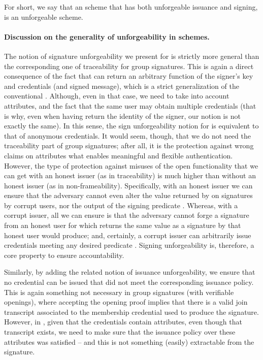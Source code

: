 For short, we say that an \UAS scheme that has both unforgeable issuance and
signing, is an unforgeable \UAS scheme.

\paragraph{Discussion on the generality of unforgeability in \UAS schemes.} %
The notion of signature unforgeability we present for \UAS is strictly more
general than the corresponding one of traceability for group signatures. This is
again a direct consequence of the fact that \Open can return an arbitrary
function of the signer's key and credentials (and signed message), which is a
strict generalization of the conventional \Open. Although, even in that case, we
need to take into account attributes, and the fact that the same user may obtain
multiple credentials (that is why, even when having \Open return the identity of
the signer, our notion is not exactly the same). In this sense, the sign
unforgeability notion for \UAS is equivalent to that of anonymous
credentials. It would seem, though, that we do not need the traceability part of
group signatures; after all, it is the protection against wrong claims on
attributes what enables meaningful and flexible authentication. However, the
type of protection against misuses of the open functionality that we can
get with an honest issuer (as in traceability) is much higher than without an
honest issuer (as in non-frameability). Specifically, with an honest issuer we
can ensure that the adversary cannot even alter the value returned by \Open on
signatures by corrupt users, nor the output of the signing predicate \feval.
Whereas, with a corrupt issuer, all we can ensure is that
the adversary cannot forge a signature from an honest user for which \Open
returns the same value as a signature by that honest user would produce; and,
certainly, a corrupt issuer can arbitrarily issue credentials meeting any
desired predicate \feval. Signing unforgeability is, therefore, a core property
to ensure accountability.

Similarly, by adding the related notion of issuance unforgeability, we ensure
that no credential can be issued that did not meet the corresponding issuance
policy. This is again something not necessary in group signatures (with
verifiable openings), where \Judge accepting the opening proof implies that
there is a valid join transcript associated to the membership credential used
to produce the signature. However, in \UAS, given that the credentials contain
attributes, even though that transcript exists, we need to make sure that the
issuance policy over these attributes was satisfied -- and this is not something
(easily) extractable from the signature.

